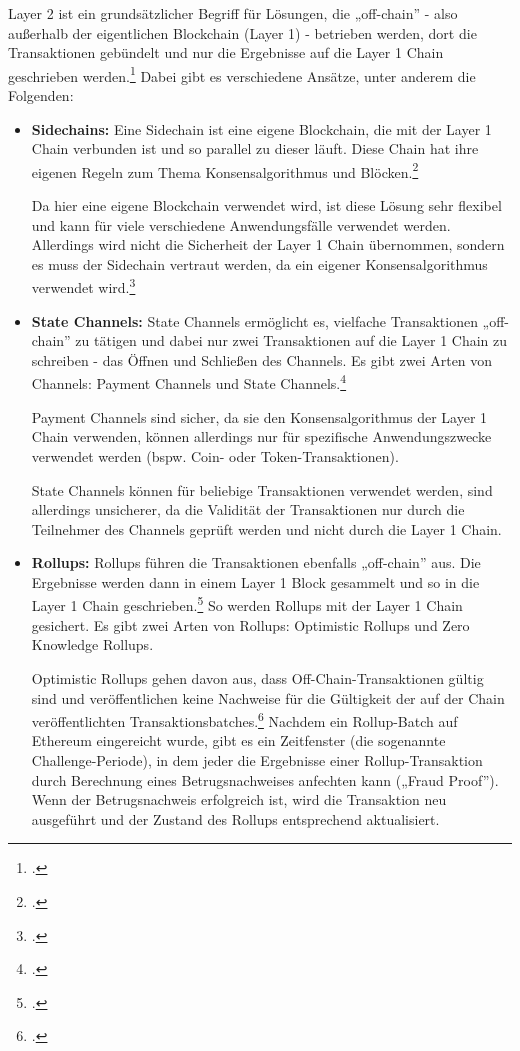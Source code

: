 \documentclass[12pt, a4paper]{article}
\begin{document}
{Layer 2 ist ein grundsätzlicher Begriff für Lösungen, die „off-chain” - also außerhalb der eigentlichen Blockchain (Layer 1) - betrieben werden, dort die Transaktionen gebündelt und nur die Ergebnisse auf die Layer 1 Chain geschrieben werden.\footcite[Vgl.][]{w18}
Dabei gibt es verschiedene Ansätze, unter anderem die Folgenden:
\begin{itemize}
    \item \textbf{Sidechains:} 
    Eine Sidechain ist eine eigene Blockchain, die mit der Layer 1 Chain verbunden ist und so parallel zu dieser läuft. 
    Diese Chain hat ihre eigenen Regeln zum Thema Konsensalgorithmus und Blöcken.\footcite[Vgl. hierzu und weiterführend][]{w20}

    \noindent
    Da hier eine eigene Blockchain verwendet wird, ist diese Lösung sehr flexibel und kann für viele verschiedene Anwendungsfälle verwendet werden.
    Allerdings wird nicht die Sicherheit der Layer 1 Chain übernommen, sondern es muss der Sidechain vertraut werden, da ein eigener Konsensalgorithmus verwendet wird.\footcite[Vgl.][]{w21}


    \item \textbf{State Channels:}
    State Channels ermöglicht es, vielfache Transaktionen „off-chain” zu tätigen und dabei nur zwei Transaktionen auf die Layer 1 Chain zu schreiben - das Öffnen und Schließen des Channels.
    Es gibt zwei Arten von Channels: Payment Channels und State Channels.\footcite[Vgl. hierzu und zum Folgenden sowie weiterführend][]{w19}

    \noindent
    Payment Channels sind sicher, da sie den Konsensalgorithmus der Layer 1 Chain verwenden, können allerdings nur für spezifische Anwendungszwecke verwendet werden (bspw. Coin- oder Token-Transaktionen).

    \noindent
    State Channels können für beliebige Transaktionen verwendet werden, sind allerdings unsicherer, da die Validität der Transaktionen nur durch die Teilnehmer des Channels geprüft werden und nicht durch die Layer 1 Chain.


    \item \textbf{Rollups:}
    Rollups führen die Transaktionen ebenfalls „off-chain” aus.
    Die Ergebnisse werden dann in einem Layer 1 Block gesammelt und so in die Layer 1 Chain geschrieben.\footcite[Vgl. hierzu und zum Folgenden][]{w18} 
    So werden Rollups mit der Layer 1 Chain gesichert.
    Es gibt zwei Arten von Rollups: Optimistic Rollups und Zero Knowledge Rollups.

    \noindent
    Optimistic Rollups gehen davon aus, dass Off-Chain-Transaktionen gültig sind und veröffentlichen keine Nachweise für die Gültigkeit der auf der Chain veröffentlichten Transaktionsbatches.\footcite[Vgl. hierzu und zum Folgenden sowie weiterführend][]{w22}
    Nachdem ein Rollup-Batch auf Ethereum eingereicht wurde, gibt es ein Zeitfenster (die sogenannte Challenge-Periode), in dem jeder die Ergebnisse einer Rollup-Transaktion durch Berechnung eines Betrugsnachweises anfechten kann („Fraud Proof”).
    Wenn der Betrugsnachweis erfolgreich ist, wird die Transaktion neu ausgeführt und der Zustand des Rollups entsprechend aktualisiert.


\end{itemize}}
\end{document}
